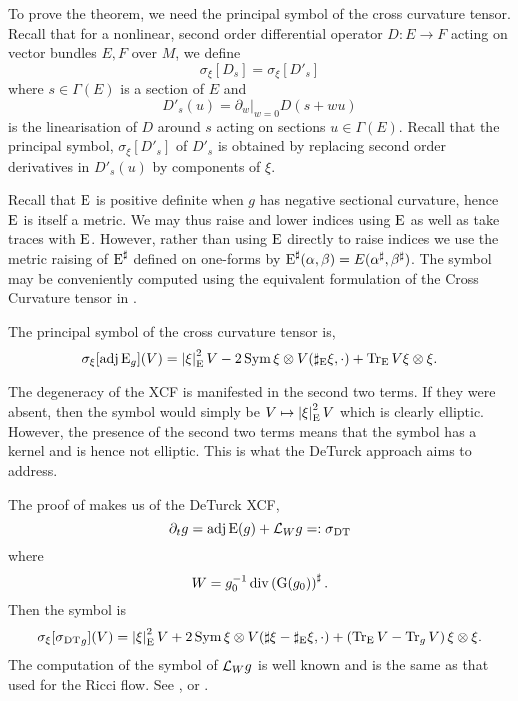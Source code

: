 \documentclass[a4paper,12pt]{amsart}
\begin{document}
To prove the theorem, we need the principal symbol of the cross curvature tensor. Recall that for a nonlinear, second order differential operator \(D : E \to F\) acting on vector bundles \(E, F\) over \(M\), we define
\begin{equation}
\label{eq:symbol}
\sigma_{\xi} [D_s] = \sigma_{\xi} [D'_s]
\end{equation}
where \(s \in \Gamma(E)\) is a section of \(E\) and
\[
D'_s (u) = \partial_w|_{w=0} D(s + w u)
\]
is the linearisation of \(D\) around \(s\) acting on sections \(u \in \Gamma(E)\). Recall that the principal symbol, \(\sigma_{\xi} [D'_s]\) of \(D'_s\) is obtained by replacing second order derivatives in \(D'_s (u)\) by components of \(\xi\).

Recall that \(\operatorname{E}\) is positive definite when \(g\) has negative sectional curvature, hence \(\operatorname{E}\) is itself a metric. We may thus raise and lower indices using \(\operatorname{E}\) as well as take traces with \(\operatorname{E}\). However, rather than using \(\operatorname{E}\) directly to raise indices we use the metric raising of \(\operatorname{E}^{\sharp}\) defined on one-forms by \(\operatorname{E}^{\sharp} (\alpha, \beta) = E(\alpha^{\sharp}, \beta^{\sharp})\). The symbol may be conveniently computed using the equivalent formulation of the Cross Curvature tensor in .

\begin{lemma}
\label{lem:xcf_symbol}
The principal symbol of the cross curvature tensor is,
\[
\sigma_{\xi} [\operatorname{adj}\operatorname{E}_g] (V) = \left\lvert{\xi}\right\rvert^2_{\operatorname{E}}V - 2 \operatorname{Sym} \xi \otimes V(\sharp_{\operatorname{E}}\xi, \cdot) + \operatorname{Tr}_{\operatorname{E}} V \xi \otimes \xi.
\]
\end{lemma}

The degeneracy of the XCF is manifested in the second two terms. If they were absent, then the symbol would simply be \(V \mapsto \left\lvert{\xi}\right\rvert^2_{\operatorname{E}} V\) which is clearly elliptic. However, the presence of the second two terms means that the symbol has a kernel and is hence not elliptic. This is what the DeTurck approach aims to address.

The proof of  makes us of the DeTurck XCF,
\begin{equation}
\label{eq:dtxcf}
\partial_t g = \operatorname{adj}\operatorname{E} (g) + \mathcal{L}_W g =: \operatorname{\operatorname{\sigma}_{\operatorname{DT}}}
\end{equation}
where
\[
W = g_0^{-1} \operatorname{div} \left(\operatorname{G}(g_0)\right)^{\sharp}.
\]
Then the symbol is
\begin{equation}
\label{eq:dtxcf_symbol}
\sigma_{\xi} [\operatorname{\operatorname{\sigma}_{\operatorname{DT}}}_g] (V) = \left\lvert{\xi}\right\rvert^2_{\operatorname{E}}V + 2 \operatorname{Sym} \xi \otimes V(\sharp \xi - \sharp_{\operatorname{E}}\xi, \cdot) + \left(\operatorname{Tr}_{\operatorname{E}} V - \operatorname{Tr}_g V\right) \xi \otimes \xi.
\end{equation}
The computation of the symbol of \(\mathcal{L}_W g\) is well known and is the same as that used for the Ricci flow. See \cite{MR2207496}, \cite[Sections 3.3, 3.4]{MR2061425} or \cite[Chapter 5]{MR2265040}.
\end{document}
